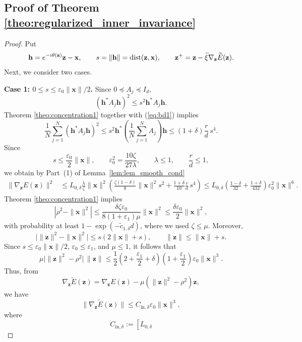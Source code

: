 \documentclass{article}
\renewcommand{\eqref}[1]{(\ref{#1})}
\newcommand{\dist}{{\rm dist}}
\newcommand{\vx}{{\mathbf x}}
\newcommand{\vz}{{\mathbf z}}
\newcommand{\vh}{{\mathbf h}}
\newcommand{\0}{{\mathbf 0}}
\numberwithin{equation}{section}
\begin{document}
	\subsection{Proof of Theorem \ref{theo:regularized_inner_invariance}}\label{subsec:proof-invariance}
	\begin{proof}
		Put
		\[
		\vh=e^{-i\theta(\vz)}\vz-\vx,\qquad
		s=\|\vh\|=\dist(\vz,\vx),\qquad
		\vz^+=\vz-\widetilde\xi\nabla_{\vz}\widetilde E(\vz).
		\]
		Next, we consider two cases.
		
		\noindent
		\textbf{Case 1: $0\le s\le\varepsilon_0\|\vx\|/2$.} Since $0\preceq A_j\preceq I_d$,
		\begin{equation}\label{eq:bd1}
			(\vh^*A_j\vh)^2
			\le s^2\vh^*A_j\vh.
		\end{equation}
		Theorem \ref{theo:concentration1} together with \eqref{eq:bd1} implies
		\[
		\frac1N\sum_{j=1}^N(\vh^*A_j\vh)^2
		\le
		s^2\vh^*
		\left(\frac1N\sum_{j=1}^NA_j\right)\vh
		\le
		(1+\delta)\frac rd\,s^4.
		\]
		Since
		\[
		s\le\frac{\varepsilon_0}{2}\|\vx\|,
		\qquad
		\varepsilon_0^2=\frac{10\zeta}{27\lambda},
		\qquad
		\lambda\le1,\qquad \frac rd\le1,
		\]
		we obtain by Part~(1) of Lemma~\ref{lem:lem_smooth_cond}
		\begin{align*}
			\|\nabla_{\vz} E(\vz)\|^2
			&\le
			L_{0,\delta}\frac{\lambda}{\zeta}\|\vx\|^2
			\left(
			\frac{\zeta(1-\delta)}8\|\vx\|^2s^2
			+\frac{1+\delta}{10}\frac rd\,s^4
			\right)\le
			L_{0,\delta}
			\left(
			\frac{1-\delta}{32}
			+\frac{1+\delta}{432}
			\right)
			\varepsilon_0^2\|\vx\|^6.
		\end{align*}
		Theorem \ref{theo:concentration1} implies
		\[
		|\rho^2-\|\vx\|^2|
		\le
		\frac{\delta\zeta\varepsilon_0}
		{8(1+\varepsilon_1)\mu}\|\vx\|^2
		\le
		\frac{\delta\varepsilon_0}{2}\|\vx\|^2,
		\]
		with probability at least $1-\exp(-\widetilde c_{1,\delta} d)$, where we used $\zeta\le\mu$. Moreover,
		\[
		\big|\|\vz\|^2-\|\vx\|^2\big|
		\le s(2\|\vx\|+s),
		\qquad
		\|\vz\|\le\|\vx\|+s.
		\]
		Since $s\le\varepsilon_0\|\vx\|/2$,
		$\varepsilon_0\le\varepsilon_1$, and $\mu\le1$, it follows that
		\[
		\mu\big|\|\vz\|^2-\rho^2\big|\,\|\vz\|
		\le
		\frac12
		\left(2+\frac{\varepsilon_1}{2}+\delta\right)
		\left(1+\frac{\varepsilon_1}{2}\right)
		\varepsilon_0\|\vx\|^3.
		\]
		Thus, from
		\[
		\nabla_{\vz}\widetilde E(\vz)
		=
		\nabla_{\vz} E(\vz)-\mu(\|\vz\|^2-\rho^2)\vz,
		\]
		we have
		\[
		\|\nabla_{\vz}\widetilde E(\vz)\|
		\le
		C_{\mathrm{in},\delta}\varepsilon_0\|\vx\|^3,
		\]
		where
		\[
		C_{\mathrm{in},\delta}
		:=
		\left[
		L_{0,\delta}
\]
\end{proof}
\end{document}
